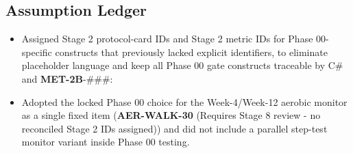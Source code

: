 \documentclass[10pt]{article}
\begin{document}
\begin{landscape}
\begin{longtblr}
\end{longtblr}

\endgroup

\subsection*{Assumption Ledger}
{}

\begin{itemize}
\item Assigned Stage 2 protocol-card IDs and Stage 2 metric IDs for Phase 00-specific constructs that previously lacked explicit identifiers, to eliminate placeholder language and keep all Phase 00 gate constructs traceable by C# and \textbf{MET-2B}-###:
  \begin{itemize}
  \end{itemize}
\item Adopted the locked Phase 00 choice for the Week-4/Week-12 aerobic monitor as a single fixed item (\textbf{AER-WALK-30} (Requires Stage 8 review - no reconciled Stage 2 IDs assigned)) and did not include a parallel step-test monitor variant inside Phase 00 testing.
\end{itemize}

\end{landscape}
\end{document}
